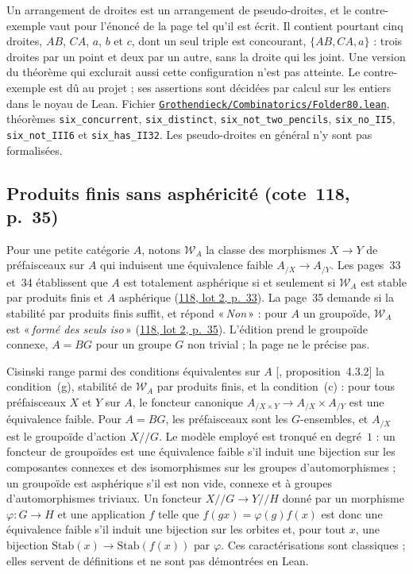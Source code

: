 \documentclass[11pt]{amsart}
\makeatletter
\newcommand{\q}[1]{«\,\textit{#1}\,»}
\def\RHM@first#1--#2\@nil{#1}
\DeclareRobustCommand{\lot}[3]{\begingroup\edef\RHM@pdfpage{\the\numexpr\RHM@first#3--\@nil+1\relax}\href{https://grothendieck.umontpellier.fr/#1.pdf\#page=\RHM@pdfpage}{#1, lot #2, p.~#3}\endgroup}
\newcommand{\leanfile}[1]{\href{https://github.com/Commutator-IO/GrothendieckArchivesProofs/blob/main/Grothendieck/#1.lean}{\nolinkurl{Grothendieck/#1.lean}}}
\newcommand{\lot}[3]{\href{https://grothendieck.commutator.io/\##1/#2/p#3}{#1, lot #2, p.~#3}}
\newcommand{\leanfile}[1]{\nolinkurl{Grothendieck/#1.lean}}
\makeatother
\begin{document}
\medskip Un arrangement de droites est un arrangement de pseudo-droites, et le contre-exemple vaut pour l'énoncé de la page tel qu'il est écrit. Il contient pourtant cinq droites, $AB$, $CA$, $a$, $b$ et $c$, dont un seul triple est concourant, $\{AB, CA, a\}$ : trois droites par un point et deux par un autre, sans la droite qui les joint. Une version du théorème qui exclurait aussi cette configuration n'est pas atteinte. Le contre-exemple est dû au projet ; ses assertions sont décidées par calcul sur les entiers dans le noyau de Lean. Fichier \leanfile{Combinatorics/Folder80}, théorèmes \texttt{six\_concurrent}, \texttt{six\_distinct}, \texttt{six\_not\_two\_pencils}, \texttt{six\_no\_II5}, \texttt{six\_not\_III6} et \texttt{six\_has\_II32}. Les pseudo-droites en général n'y sont pas formalisées.

\subsection*{Produits finis sans asphéricité (cote~118, p.~35)}

Pour une petite catégorie $A$, notons $\mathcal W_A$ la classe des morphismes $X \to Y$ de préfaisceaux sur $A$ qui induisent une équivalence faible $A_{/X} \to A_{/Y}$. Les pages~33 et~34 établissent que $A$ est totalement asphérique si et seulement si $\mathcal W_A$ est stable par produits finis et $A$ asphérique (\lot{118}{2}{33}). La page~35 demande si la stabilité par produits finis suffit, et répond \q{Non} : pour $A$ un groupoïde, $\mathcal W_A$ est \q{formé des seuls iso} (\lot{118}{2}{35}). L'édition prend le groupoïde connexe, $A = BG$ pour un groupe $G$ non trivial ; la page ne le précise pas.

Cisinski range parmi des conditions équivalentes sur $A$ [\citealp{cisinski2006}, proposition~4.3.2] la condition~(g), stabilité de $\mathcal W_A$ par produits finis, et la condition~(c) : pour tous préfaisceaux $X$ et $Y$ sur $A$, le foncteur canonique $A_{/X \times Y} \to A_{/X} \times A_{/Y}$ est une équivalence faible. Pour $A = BG$, les préfaisceaux sont les $G$-ensembles, et $A_{/X}$ est le groupoïde d'action $X /\!/ G$. Le modèle employé est tronqué en degré~$1$ : un foncteur de groupoïdes est une équivalence faible s'il induit une bijection sur les composantes connexes et des isomorphismes sur les groupes d'automorphismes ; un groupoïde est asphérique s'il est non vide, connexe et à groupes d'automorphismes triviaux. Un foncteur $X/\!/G \to Y/\!/H$ donné par un morphisme $\varphi\colon G \to H$ et une application $f$ telle que $f(gx) = \varphi(g) f(x)$ est donc une équivalence faible s'il induit une bijection sur les orbites et, pour tout $x$, une bijection $\mathrm{Stab}(x) \to \mathrm{Stab}(f(x))$ par $\varphi$. Ces caractérisations sont classiques ; elles servent de définitions et ne sont pas démontrées en Lean.
\end{document}
